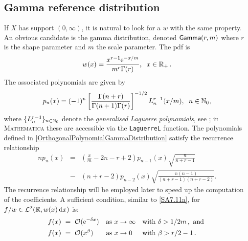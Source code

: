 \subsection{Gamma reference distribution}\label{SS:GammaNu}
If $X$ has support $(0,\infty)$, it is natural to look for a $w$ with the same property.
An obvious candidate is the gamma distribution, denoted $\mathsf{Gamma}(r,m)$ where $r$ is the shape parameter
and $m$ the scale parameter. The pdf is
\begin{equation} \label{GammaPDF}
w(x)=\frac{x^{r-1} \mathrm{e}^{-x/m}}{m^{r}\Gamma(r)},\hspace{0.2cm}x\in \mathbb{R}_+ \,.
\end{equation}
The associated polynomials are given by
\begin{equation} \label{OrthogonalPolynomialGammaDistribution}
p_{n}(x)=(-1)^{n}\left[\frac{\Gamma(n+r)}{\Gamma(n+1)\Gamma(r)}\right]^{-1/2}L_{n}^{r-1}(x/m),\hspace{0.2cm} n\in\mathbb{N}_0,
\end{equation}
where $\{L^{r-1}_{n}\}_{n\in\mathbb{N}_0}$ denote the \emph{generalised Laguerre polynomials}, see \cite{Szegoe1939}; in \textsc{Mathematica} these are accessible via the \texttt{LaguerreL} function.
The polynomials defined in \eqref{OrthogonalPolynomialGammaDistribution} satisfy the recurrence relationship
\begin{eqnarray} \label{OrthogonalPolynomialGammaDistributionRecurreceRelationship}
np_{n}(x)&=&\left(\frac{x}{m}-2n-r+2\right)p_{n-1}(x)\sqrt{\frac{n}{n+r-1}}\nonumber\\
&-&(n+r-2)p_{n-2}(x)\sqrt{\frac{n(n-1)}{(n+r-1)(n+r-2)}}.
\end{eqnarray}
The recurrence relationship will be employed later to speed up the computation of the coefficients.
A sufficient condition, similar to \eqref{SA7.11a}, for $f/w\in\mathcal{L}^2(\mathbb{R}, w(x) \mathop{}\!\mathrm{d} x)$ is:
\begin{equation} \label{SA7.11b}
\begin{alignedat}{4}
f(x)\ &=\ {\mathcal{O}}(\mathrm{e}^{ -\delta x }) \quad &&\text{as } x\to\infty \quad && \text{with } \delta>1/2m\,, \text{ and }\\
f(x)\ &=\ {\mathcal{O}}(x^\beta) \quad &&\text{as } x\to 0 \quad && \text{with } \beta>r/2-1\,.
\end{alignedat}
\end{equation}

